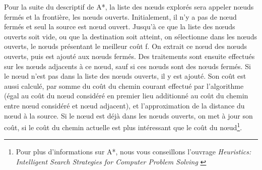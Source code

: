 \documentclass[pidr]{tnreport}
\begin{document}
Pour la suite du descriptif de A*, la liste des nœuds explorés sera appeler nœuds fermés et la frontière, les nœuds ouverts. Initialement, il n'y a pas de nœud fermés et seul la source est nœud ouvert. Jusqu'à ce que la liste des nœuds ouverts soit vide, ou que la destination soit atteint, on sélectionne dans les nœuds ouverts, le nœuds présentant le meilleur coût f. On extrait ce nœud des nœuds ouverts, puis est ajouté aux nœuds fermés. Des traitements sont ensuite effectués sur les nœuds adjacents à ce nœud, sauf si ces nœuds sont des nœuds fermés. Si le nœud n'est pas dans la liste des nœuds ouverts, il y est ajouté. Son coût est aussi calculé, par somme du coût du chemin courant effectué par l'algorithme (égal au coût du nœud considéré en premier lieu additionné au coût du chemin entre nœud considéré et nœud adjacent), et l'approximation de la distance du nœud à la source. Si le nœud est déjà dans les nœuds ouverts, on met à jour son coût, si le coût du chemin actuelle est plus intéressant que le coût du nœud\footnote{Pour plus d'informations sur A*, nous vous conseillons l'ouvrage \textit{Heuristics: Intelligent Search Strategies for Computer Problem Solving} \cite{Jupea}}. \newline \newline
\end{document}
